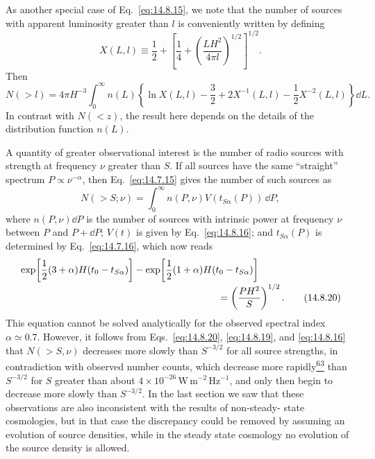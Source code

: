As another special case of Eq.~\eqref{eq:14.8.15}, we note that the number
of sources with apparent luminosity greater than \(l\) is conveniently
written by defining
\[
  X(L,l)
  \equiv
  \frac12
  +
  \left[
    \frac14
    +
    \left(
      \frac{LH^2}{4\pi l}
    \right)^{1/2}
  \right]^{1/2}.
\]
Then
\begin{equation}
  N(>l)
  =
  4\pi H^{-3}
  \int_0^\infty
  n(L)
  \left\{
    \ln X(L,l)
    -\frac32
    +2X^{-1}(L,l)
    -\frac12X^{-2}(L,l)
  \right\}
  \dd L.
  \tag{14.8.18}\label{eq:14.8.18}
\end{equation}
In contrast with \(N(<z)\), the result here depends on the details of the
distribution function \(n(L)\).

A quantity of greater observational interest is the number of radio sources
with strength at frequency \(\nu\) greater than \(S\). If all sources have
the same ``straight'' spectrum \(P\propto\nu^{-\alpha}\), then
Eq.~\eqref{eq:14.7.15} gives the number of such sources as
\begin{equation}
  N(>S;\nu)
  =
  \int_0^\infty
  n(P,\nu)V(t_{S\alpha}(P))\,\dd P,
  \tag{14.8.19}\label{eq:14.8.19}
\end{equation}
where \(n(P,\nu)\dd P\) is the number of sources with intrinsic power at
frequency \(\nu\) between \(P\) and \(P+\dd P\);
\(V(t)\) is given by Eq.~\eqref{eq:14.8.16}; and \(t_{S\alpha}(P)\) is
determined by Eq.~\eqref{eq:14.7.16}, which now reads
\begin{align}
  &\exp\!\left[
    \frac12(3+\alpha)H(t_0-t_{S\alpha})
  \right]
  -
  \exp\!\left[
    \frac12(1+\alpha)H(t_0-t_{S\alpha})
  \right]
  \notag\\[-2pt]
  &\hspace{7.2cm}
  =
  \left(\frac{PH^2}{S}\right)^{1/2}.
  \tag{14.8.20}\label{eq:14.8.20}
\end{align}
This equation cannot be solved analytically for the observed spectral index
\(\alpha\simeq0.7\). However, it follows from
Eqs.~\eqref{eq:14.8.20}, \eqref{eq:14.8.19}, and \eqref{eq:14.8.16} that
\(N(>S,\nu)\) decreases more slowly than \(S^{-3/2}\) for all source
strengths, in contradiction with observed number counts, which decrease
more rapidly\hyperref[ch14-ref-63]{\textsuperscript{63}} than \(S^{-3/2}\)
for \(S\) greater than about
\(4\times10^{-26}\,\mathrm{W\,m^{-2}\,Hz^{-1}}\), and only then begin to
decrease more slowly than \(S^{-3/2}\). In the last section we saw that
these observations are also inconsistent with the results of non-steady-
state cosmologies, but in that case the discrepancy could be removed by
assuming an evolution of source densities, while in the steady state
cosmology no evolution of the source density is allowed.

